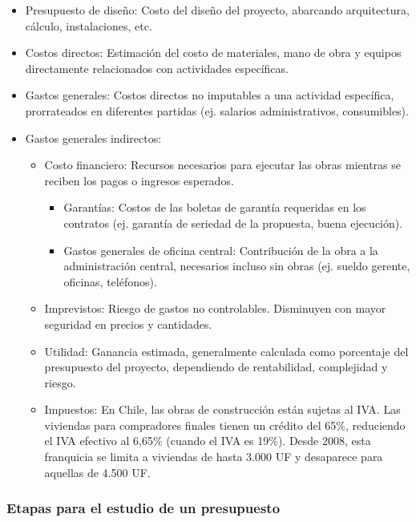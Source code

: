 \begin{itemize}
    \item Presupuesto de diseño: Costo del diseño del proyecto, abarcando arquitectura, cálculo, instalaciones, etc.
    \item Costos directos: Estimación del costo de materiales, mano de obra y equipos directamente relacionados con actividades específicas.
    \item Gastos generales: Costos directos no imputables a una actividad específica, prorrateados en diferentes partidas (ej. salarios administrativos, consumibles).
    \item Gastos generales indirectos: 
    \begin{itemize}
        \item Costo financiero: Recursos necesarios para ejecutar las obras mientras se reciben los pagos o ingresos esperados.
        \begin{itemize}
            \item Garantías: Costos de las boletas de garantía requeridas en los contratos (ej. garantía de seriedad de la propuesta, buena ejecución).
            \item Gastos generales de oficina central: Contribución de la obra a la administración central, necesarios incluso sin obras (ej. sueldo gerente, oficinas, teléfonos).
        \end{itemize}
        \item Imprevistos: Riesgo de gastos no controlables. Disminuyen con mayor seguridad en precios y cantidades.
        \item Utilidad: Ganancia estimada, generalmente calculada como porcentaje del presupuesto del proyecto, dependiendo de rentabilidad, complejidad y riesgo.
        \item Impuestos: En Chile, las obras de construcción están sujetas al IVA. Las viviendas para compradores finales tienen un crédito del 65\%, reduciendo el IVA efectivo al 6,65\% (cuando el IVA es 19\%). Desde 2008, esta franquicia se limita a viviendas de hasta 3.000 UF y desaparece para aquellas de 4.500 UF.
    \end{itemize}
\end{itemize}

\subsubsection{Etapas para el estudio de un presupuesto}

